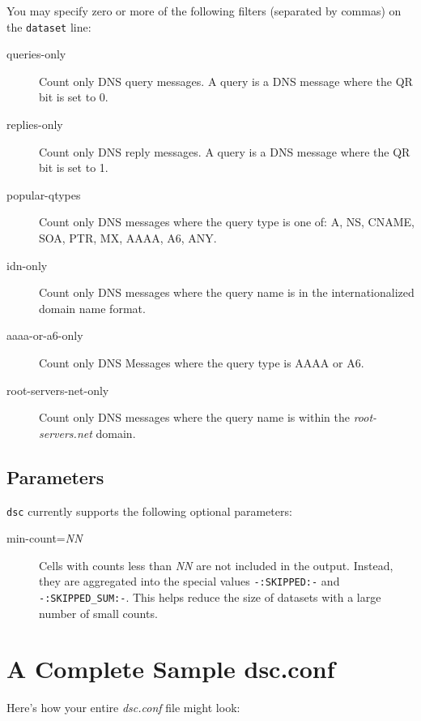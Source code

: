 \documentclass{report}
\begin{document}
You may specify zero or more of the following filters (separated by commas) on
the {\tt dataset\/} line:

\begin{description}
\item[queries-only]
	Count only DNS query messages.  A query is a DNS message
	where the QR bit is set to 0.
\item[replies-only]
	Count only DNS reply messages.  A query is a DNS message 
        where the QR bit is set to 1.
\item[popular-qtypes]
	Count only DNS messages where the query type is one of:
	A, NS, CNAME, SOA, PTR, MX, AAAA, A6, ANY.
\item[idn-only]
	Count only DNS messages where the query name is in the
	internationalized domain name format.
\item[aaaa-or-a6-only]
	Count only DNS Messages where the query type is AAAA or A6.
\item[root-servers-net-only]
	Count only DNS messages where the query name is within
	the {\em root-servers.net\/} domain.
\end{description}

\subsection{Parameters}

\noindent
{\tt dsc\/} currently supports the following optional parameters:

\begin{description}
\item[min-count={\em NN\/}]
	Cells with counts less than {\em NN\/} are not included
	in the output.  Instead, they are aggregated into the special
	values {\tt -:SKIPPED:-\/} and {\tt -:SKIPPED\_SUM:-\/}.  This helps reduce
	the size of datasets with a large number of small counts.
\end{description}

\section{A Complete Sample dsc.conf}

Here's how your entire {\em dsc.conf\/} file might look:

\noindent\hrulefill
\end{document}
